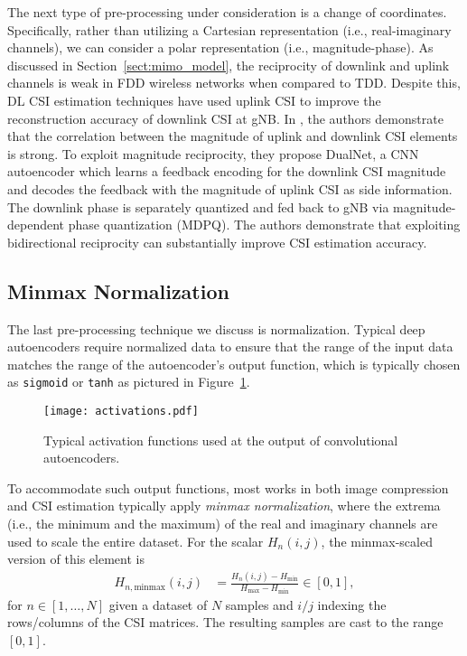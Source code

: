 The next type of pre-processing under consideration is a change of coordinates. Specifically, rather than utilizing a Cartesian representation (i.e., real-imaginary channels), we can consider a polar representation (i.e., magnitude-phase). As discussed in Section~\ref{sect:mimo_model}, the reciprocity of downlink and uplink channels is weak in FDD wireless networks when compared to TDD. Despite this, DL CSI estimation techniques have used uplink CSI to improve the reconstruction accuracy of downlink CSI at gNB. In \cite{ref:dualnet}, the authors demonstrate that the correlation between the magnitude of uplink and downlink CSI elements is strong. To exploit magnitude reciprocity, they propose DualNet, a CNN autoencoder which learns a feedback encoding for the downlink CSI magnitude and decodes the feedback with the magnitude of uplink CSI as side information. The downlink phase is separately quantized and fed back to gNB via magnitude-dependent phase quantization (MDPQ). The authors demonstrate that exploiting bidirectional reciprocity can substantially improve CSI estimation accuracy.

\subsection{Minmax Normalization}

The last pre-processing technique we discuss is normalization. Typical deep autoencoders require normalized data to ensure that the range of the input data matches the range of the autoencoder's output function, which is typically chosen as \texttt{sigmoid} or \texttt{tanh} as pictured in Figure~\ref{fig:ae_output_fx}. 
\begin{figure}[htb]
  \centering
  \texttt{[image: activations.pdf]}
  \caption{Typical activation functions used at the output of convolutional autoencoders.}
  \label{fig:ae_output_fx}
\end{figure}
To accommodate such output functions, most works in both image compression and CSI estimation typically apply \emph{minmax normalization}, where the extrema (i.e., the minimum and the maximum) of the real and imaginary channels are used to scale the entire dataset. For the scalar $H_n(i,j)$, the minmax-scaled version of this element is
\begin{align*}
	H_{n,\text{minmax}}(i,j) &= \frac{H_n(i,j)-H_{\text{min}}}{H_{\text{max}}-H_{\text{min}}} \in [0,1],
\end{align*}
for $n \in [1,\dots,N]$ given a dataset of $N$ samples and $i/j$ indexing the rows/columns of the CSI matrices. The resulting samples are cast to the range $[0,1]$. %

